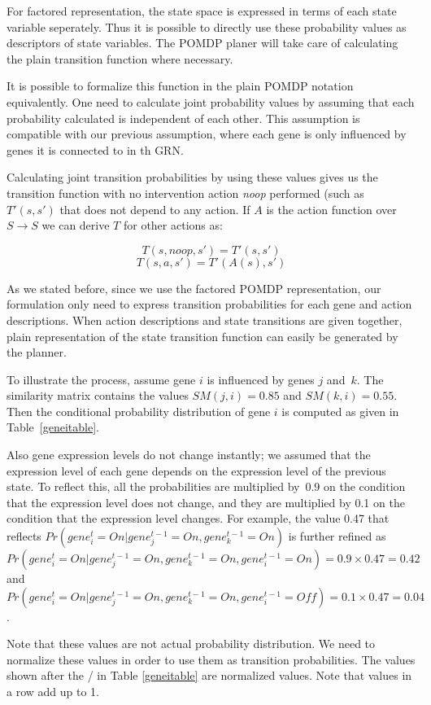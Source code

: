 \begin{enumerate}
For factored representation, the state space is expressed in terms of each state variable seperately. 
Thus it is possible to directly use these probability values as descriptors of 
state variables. The POMDP planer will take care of calculating the plain transition function where
necessary.

It is possible to formalize this function in the plain POMDP notation equivalently. One need to calculate
joint probability values by assuming that each probability calculated is independent of each other. This 
assumption is compatible with our previous assumption, where each gene is only influenced by genes it is 
connected to in th GRN.

Calculating joint transition probabilities by using these values gives us the transition function with no 
intervention action \emph{noop} performed (such as $T'(s,s')$ that does not depend to any action. 
If $A$ is the action function over $S \to S$ we can derive $T$ for other actions as:

\begin{equation}
T(s,noop,s') = T'(s,s')
\end{equation}
\begin{equation}
T(s,a,s') = T'(A(s),s')
\end{equation}
\end{enumerate}

As we stated before, since we use the factored POMDP representation, our formulation only need to express
transition probabilities for each gene and action descriptions. When action descriptions and state transitions 
are given together, plain representation of the state transition function can easily be generated by the planner.


To illustrate the process, assume gene $i$ is influenced by genes $j$ and~$k$. The
similarity matrix contains the values $SM(j, i) = 0.85$ and $SM(k, i) = 0.55$. Then the conditional
probability distribution of gene $i$ is computed as given in Table~\ref{geneitable}.

Also gene expression levels do not change instantly; we assumed that the expression level of each gene
depends on the expression level of the previous state. To reflect this, all the probabilities are multiplied
by~0.9 on the condition that the expression level does not change, and they are multiplied by 0.1 on the
condition that the expression level changes. For example, the value 0.47 that reflects $Pr(gene_i^t = On |
gene_j^{t-1} = On, gene_k^{t-1} = On)$ is further refined as $Pr(gene_i^t = On | gene_j^{t-1} = On,
gene_k^{t-1} = On, gene_i^{t-1} = On) = 0.9 \times 0.47 = 0.42$ and $Pr(gene_i^t = On | gene_j^{t-1} = On,
gene_k^{t-1} = On, gene_i^{t-1} = Off) = 0.1 \times 0.47 = 0.04$.

Note that these values are not actual probability distribution. We need to normalize these values in order to
use them as transition probabilities. The values shown after the / in Table \ref{geneitable} are normalized values. Note that values in a row add up to 1.
